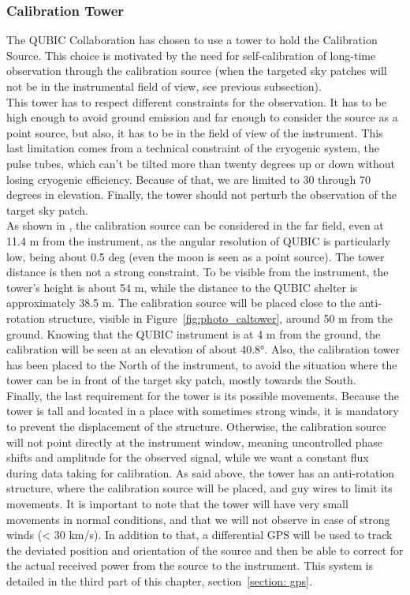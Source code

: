 \documentclass[../../thesis.tex]{subfiles}
\begin{document}
\subsubsection{Calibration Tower} \label{cal tower}
The QUBIC Collaboration has chosen to use a tower to hold the Calibration Source. This choice is motivated by the need for self-calibration of long-time observation through the calibration source (when the targeted sky patches will not be in the instrumental field of view, see previous subsection). \\
This tower has to respect different constraints for the observation. It has to be high enough to avoid ground emission and far enough to consider the source as a point source, but also, it has to be in the field of view of the instrument. This last limitation comes from a technical constraint of the cryogenic system, the pulse tubes, which can't be tilted more than twenty degrees up or down without losing cryogenic efficiency. Because of that, we are limited to 30 through 70 degrees in elevation. Finally, the tower should not perturb the observation of the target sky patch. \\
As shown in \cite{qubic3}, the calibration source can be considered in the far field, even at 11.4 m from the instrument, as the angular resolution of QUBIC is particularly low, being about 0.5 deg (even the moon is seen as a point source). The tower distance is then not a strong constraint. To be visible from the instrument, the tower's height is about 54 m, while the distance to the QUBIC shelter is approximately 38.5 m. The calibration source will be placed close to the anti-rotation structure, visible in Figure~\ref{fig:photo_caltower}, around 50 m from the ground. Knowing that the QUBIC instrument is at 4 m from the ground, the calibration will be seen at an elevation of about 40.8°. Also, the calibration tower has been placed to the North of the instrument, to avoid the situation where the tower can be in front of the target sky patch, mostly towards the South. \\
Finally, the last requirement for the tower is its possible movements. Because the tower is tall and located in a place with sometimes strong winds, it is mandatory to prevent the displacement of the structure. Otherwise, the calibration source will not point directly at the instrument window, meaning uncontrolled phase shifts and amplitude for the observed signal, while we want a constant flux during data taking for calibration. As said above, the tower has an anti-rotation structure, where the calibration source will be placed, and guy wires to limit its movements. It is important to note that the tower will have very small movements in normal conditions, and that we will not observe in case of strong winds (< 30 km/s). In addition to that, a differential GPS will be used to track the deviated position and orientation of the source and then be able to correct for the actual received power from the source to the instrument. This system is detailed in the third part of this chapter, section~\ref{section: gps}.
\end{document}
